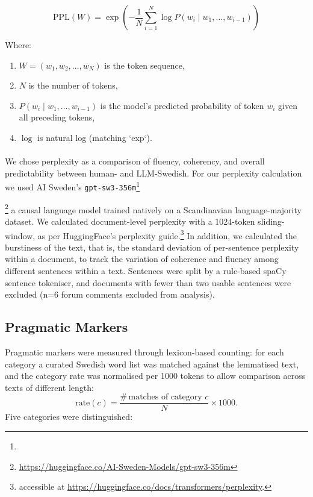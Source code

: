 \documentclass[thesis]{cluu}
\providecommand{\DIFadd}[1]{\texorpdfstring{\highLight[yellow]{#1}}{#1}} %
\providecommand{\DIFadd}[1]{#1} %
\providecommand{\DIFdel}[1]{} %
\providecommand{\DIFaddbegin}{} %
\providecommand{\DIFaddend}{} %
\providecommand{\DIFdelbegin}{} %
\providecommand{\DIFdelend}{} %
\begin{document}
\begin{equation}
\text{PPL}(W) = \exp\left(-\frac{1}{N}\sum_{i=1}^{N} \log P(w_i \mid w_1, \dots, w_{i-1})\right)
\label{eq:perplexity}
\end{equation}

Where:
\begin{enumerate}
    \item $W = (w_1, w_2, \dots, w_N)$ is the token sequence,
    \item $N$ is the number of tokens,
    \item $P(w_i \mid w_1, \dots, w_{i-1})$ is the model's predicted probability of token $w_i$ given all preceding tokens,
    \item $\log$ is natural log (matching `exp`).
\end{enumerate}
\paragraph{}
We chose perplexity as a comparison of fluency, coherency, and overall predictability between human- and LLM-Swedish. For our perplexity calculation we used AI Sweden's \texttt{gpt-sw3-356m}\DIFdelbegin \footnote{\DIFdel{model accessible at https://huggingface.co/AI-Sweden-Models/gpt-sw3-356m}}%
\addtocounter{footnote}{-1}%
\DIFdel{,}\DIFdelend \DIFaddbegin \DIFadd{,}\footnote{\DIFadd{Model accessible at }\url{https://huggingface.co/AI-Sweden-Models/gpt-sw3-356m}\DIFadd{.}} \DIFaddend a causal language model trained natively on a Scandinavian language-majority dataset. We calculated document-level perplexity with a  1024-token sliding-window, as per HuggingFace's perplexity guide.\footnote{\DIFdelbegin \DIFdel{guide }\DIFdelend \DIFaddbegin \DIFadd{Guide }\DIFaddend accessible at \DIFdelbegin \DIFdel{https://huggingface}\DIFdelend \DIFaddbegin \url{https://huggingface.co/docs/transformers/perplexity}\DIFaddend .\DIFdelbegin \DIFdel{co/docs/transformers/perplexity}\DIFdelend } In addition, we calculated the burstiness of the text, that is, the standard deviation of per-sentence perplexity within a document, to track the variation of coherence and fluency among different sentences within a text. Sentences were split by a rule-based spaCy sentence tokeniser, and documents with fewer than two usable sentences were excluded (n=6 forum comments excluded from analysis).


\subsection{Pragmatic Markers}
Pragmatic markers were measured through lexicon-based counting: for each category a
curated Swedish word list was matched against the lemmatised text, and the
category rate was normalised per 1000 tokens to allow comparison across texts of
different length:
\begin{equation}
\mathrm{rate}(c) = \frac{\#\,\text{matches of category } c}{N}\times 1000 .
\end{equation}
Five categories were distinguished:
\end{document}
